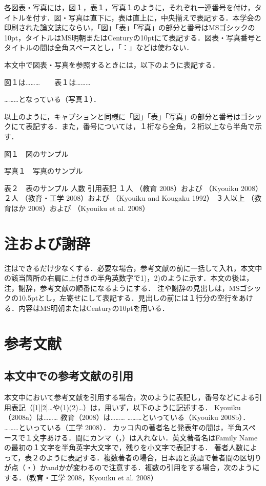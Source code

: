 \documentclass[dvipdfmx]{jset-study-group}
\begin{document}
各図表・写真には，図１，表１，写真１のように，それぞれ一連番号を付け，タイトルを付す．図・写真は直下に，表は直上に，中央揃えで表記する．本学会の印刷された論文誌にならい，「図」「表」「写真」の部分と番号はMSゴシックの10pt，タイトルはMS明朝またはCenturyの10ptにて表記する．図表・写真番号とタイトルの間は全角スペースとし，「：」などは使わない．

本文中で図表・写真を参照するときには，以下のように表記する．

図１は………　　表１は………

………となっている（写真１）．

以上のように，キャプションと同様に「図」「表」「写真」の部分と番号はゴシックにて表記する．また，番号については，１桁なら全角，２桁以上なら半角で示す．

図１　図のサンプル



写真１　写真のサンプル

表２　表のサンプル
人数
引用表記
１人
（教育 2008）および
（Kyouiku 2008）
２人
（教育・工学 2008）および
（Kyouiku and Kougaku 1992）
３人以上
（教育ほか 2008）および
（Kyouiku et al. 2008）

\section{注および謝辞}

注はできるだけ少なくする．必要な場合，参考文献の前に一括して入れ，本文中の該当箇所の右肩に上付きの半角英数字で1)，2)のように示す．本文の後は，注，謝辞，参考文献の順番になるようにする．
注や謝辞の見出しは，MSゴシックの10.5ptとし，左寄せにして表記する．見出しの前には１行分の空行をあける．内容はMS明朝またはCenturyの10ptを用いる．


\section{参考文献}

\subsection{本文中での参考文献の引用}

本文中において参考文献を引用する場合，次のように表記し，番号などによる引用表記（[1][2]…や(1)(2)…）は，用いず，以下のように記述する．
Kyouiku（2008a）は………
教育（2008）は………
………といっている（Kyouiku 2008b）．
………といっている（工学 2008）．
カッコ内の著者名と発表年の間は，半角スペースで１文字あける．間にカンマ（，）は入れない．英文著者名はFamily Nameの最初の１文字を半角英字大文字で，残りを小文字で表記する．
著者人数によって，表２のように表記する．複数著者の場合，日本語と英語で著者間の区切りが点（・）かandかが変わるので注意する．複数の引用をする場合，次のようにする．（教育・工学 2008，Kyouiku et al. 2008）
\end{document}
